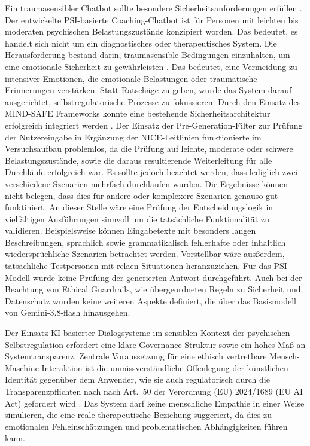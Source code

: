 Ein traumasensibler Chatbot sollte besondere Sicherheitsanforderungen erfüllen \citep{boit2025prompt}. Der entwickelte PSI-basierte Coaching-Chatbot ist für Personen mit leichten bis moderaten psychischen Belastungszustände konzipiert worden. Das bedeutet, es handelt sich nicht um ein diagnostisches oder therapeutisches System. Die Herausforderung bestand darin, traumasensible Bedingungen einzuhalten, um eine emotionale Sicherheit zu gewährleisten \citep{Levine2010}. Das bedeutet, eine Vermeidung zu intensiver Emotionen, die emotionale Belastungen oder traumatische Erinnerungen verstärken. Statt Ratschäge zu geben, wurde das System darauf ausgerichtet, selbstregulatorische Prozesse zu fokussieren. 
Durch den Einsatz des MIND-SAFE Frameworks konnte eine bestehende Sicherheitsarchitektur erfolgreich integriert werden \citep{boit2025prompt}. 
Der Einsatz der Pre-Generation-Filter zur Prüfung der Nutzereingabe in Ergänzung der NICE-Leitlinien funktionierte im Versuchsaufbau problemlos, da die Prüfung auf leichte, moderate oder schwere Belastungszustände, sowie die daraus resultierende Weiterleitung für alle Durchläufe erfolgreich war. Es sollte jedoch beachtet werden, dass lediglich zwei verschiedene Szenarien mehrfach durchlaufen wurden. Die Ergebnisse können nicht belegen, dass dies für andere oder komplexere Szenarien genauso gut funktiniert. An dieser Stelle wäre eine Prüfung der Entscheidungslogik in vielfältigen Ausführungen sinnvoll um die tatsächliche Funktionalität zu validieren. Beispielsweise können Eingabetexte mit besonders langen Beschreibungen, sprachlich sowie grammatikalisch fehlerhafte oder inhaltlich wiedersprüchliche Szenarien betrachtet werden. Vorstellbar wäre ausßerdem, tatsächliche Testpersonen mit relaen Situationen heranzuziehen. 
Für das PSI-Modell wurde keine Prüfung der generierten Antwort durchgeführt. Auch bei der Beachtung von Ethical Guardrails, wie übergeordneten Regeln zu Sicherheit und Datenschutz wurden keine weiteren Aspekte definiert, die über das Basismodell von Gemini-3.8-flash hinausgehen. 

Der Einsatz KI-basierter Dialogsysteme im sensiblen Kontext der psychischen 
Selbstregulation erfordert eine klare Governance-Struktur sowie ein hohes Maß an 
Systemtransparenz. Zentrale Voraussetzung für eine ethisch vertretbare Mensch-Maschine-Interaktion ist 
die unmissverständliche Offenlegung der künstlichen Identität gegenüber dem Anwender, 
wie sie auch regulatorisch durch die Transparenzpflichten nach nach Art.~50 der 
Verordnung (EU) 2024/1689 (EU AI Act) gefordert wird \citep[Art.~50]{eu2024aiact}.
Das System darf keine menschliche Empathie in einer 
Weise simulieren, die eine reale therapeutische Beziehung suggeriert, da dies zu 
emotionalen Fehleinschätzungen und problematischen Abhängigkeiten führen kann. 

